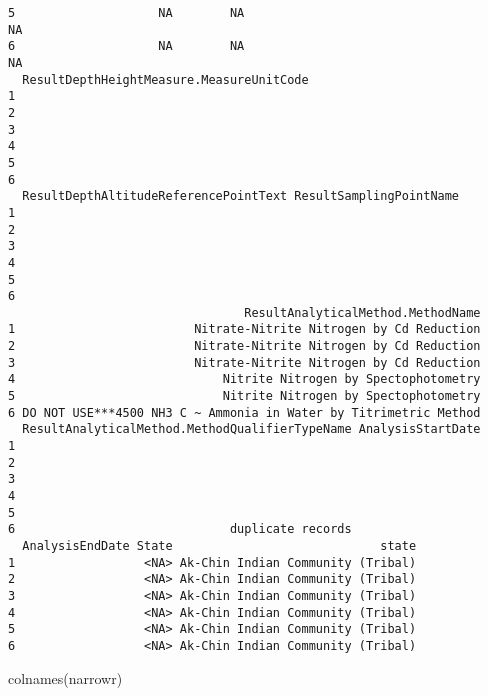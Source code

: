 \documentclass[
  12pt,
]{article}
\newenvironment{Shaded}{\begin{snugshade}}{\end{snugshade}}
\newcommand{\FunctionTok}[1]{\textcolor[rgb]{0.28,0.35,0.67}{#1}}
\newcommand{\NormalTok}[1]{\textcolor[rgb]{0.00,0.23,0.31}{#1}}
\begin{document}
\begin{verbatim}
5                    NA        NA                                    NA
6                    NA        NA                                    NA
  ResultDepthHeightMeasure.MeasureUnitCode
1                                         
2                                         
3                                         
4                                         
5                                         
6                                         
  ResultDepthAltitudeReferencePointText ResultSamplingPointName
1                                                              
2                                                              
3                                                              
4                                                              
5                                                              
6                                                              
                                 ResultAnalyticalMethod.MethodName
1                         Nitrate-Nitrite Nitrogen by Cd Reduction
2                         Nitrate-Nitrite Nitrogen by Cd Reduction
3                         Nitrate-Nitrite Nitrogen by Cd Reduction
4                             Nitrite Nitrogen by Spectophotometry
5                             Nitrite Nitrogen by Spectophotometry
6 DO NOT USE***4500 NH3 C ~ Ammonia in Water by Titrimetric Method
  ResultAnalyticalMethod.MethodQualifierTypeName AnalysisStartDate
1                                                                 
2                                                                 
3                                                                 
4                                                                 
5                                                                 
6                              duplicate records                  
  AnalysisEndDate State                             state
1                  <NA> Ak-Chin Indian Community (Tribal)
2                  <NA> Ak-Chin Indian Community (Tribal)
3                  <NA> Ak-Chin Indian Community (Tribal)
4                  <NA> Ak-Chin Indian Community (Tribal)
5                  <NA> Ak-Chin Indian Community (Tribal)
6                  <NA> Ak-Chin Indian Community (Tribal)
\end{verbatim}

\begin{Shaded}
\begin{Highlighting}[]
\FunctionTok{colnames}\NormalTok{(narrowr)}
\end{Highlighting}
\end{Shaded}
\end{document}
